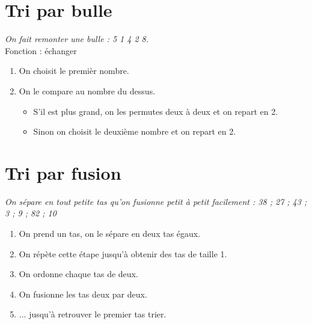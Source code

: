 \documentclass[paper=a4, fontsize=9pt]{scrartcl} %
\begin{document}
\section{Tri par bulle}

\textit{On fait remonter une bulle :  5 1 4 2 8.}\\
Fonction : échanger
\begin{enumerate}
\item On choisit le premièr nombre.
\item On le compare au nombre du dessus.
  \begin{itemize}
  \item S'il est plus grand, on les permutes deux à deux et on repart en 2.
  \item Sinon on choisit le deuxième nombre et on repart en 2.
  \end{itemize}
\end{enumerate}


\section{Tri par fusion}

\textit{On sépare en tout petite tas qu'on fusionne petit à petit facilement :  38 ; 27 ; 43 ; 3 ; 9 ; 82 ; 10}\\

\begin{enumerate}
\item On prend un tas, on le sépare en deux tas égaux.
\item On répète cette étape jusqu'à obtenir des tas de taille 1.
\item On ordonne chaque tas de deux.
\item On fusionne les tas deux par deux.
\item ... jusqu'à retrouver le premier tas trier.
\end{enumerate}


\newpage
\end{document}
